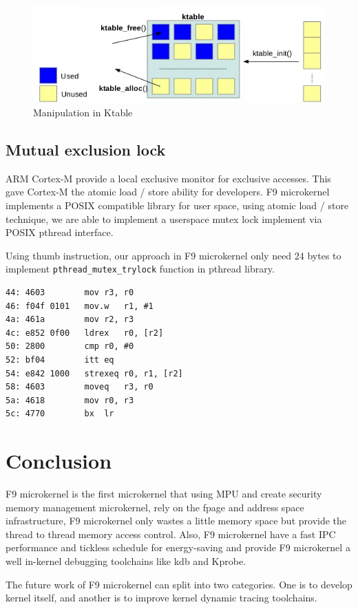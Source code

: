 \documentclass[10pt,preprint,nocopyrightspace]{sigplanconf}
\begin{document}
\begin{figure}[H]
	\begin{center}
		\includegraphics[width=\linewidth]{picture/ktable.png}
	\end{center}
	\caption{Manipulation in Ktable\cite{ncku2015}}
\end{figure}

\subsection{Mutual exclusion lock}
ARM Cortex-M provide a local exclusive monitor for exclusive accesses. This gave Cortex-M the atomic load / store ability for developers\cite{arm2012v7}. F9 microkernel implements a POSIX compatible library for user space, using atomic load / store technique, we are able to implement a userspace mutex lock implement via POSIX pthread interface.

Using thumb instruction, our approach in F9 microkernel only need 24 bytes to implement \texttt{pthread\_mutex\_trylock} function in pthread library.

\begin{lstlisting}[basicstyle=\small,frame=single]
44:	4603      	mov	r3, r0
46:	f04f 0101 	mov.w	r1, #1
4a:	461a      	mov	r2, r3
4c:	e852 0f00 	ldrex	r0, [r2]
50:	2800      	cmp	r0, #0
52:	bf04      	itt	eq
54:	e842 1000 	strexeq	r0, r1, [r2]
58:	4603      	moveq	r3, r0
5a:	4618      	mov	r0, r3
5c:	4770      	bx	lr
\end{lstlisting}

\section{Conclusion}
F9 microkernel is the first microkernel that using MPU and create security memory management microkernel, rely on the fpage and address space infrastructure, F9 microkernel only wastes a little memory space but provide the thread to thread memory access control. Also, F9 microkernel have a fast IPC performance and tickless schedule for energy-saving and provide F9 microkernel a well in-kernel debugging toolchains like kdb and Kprobe.

The future work of F9 microkernel can split into two categories. One is to develop kernel itself, and another is to improve kernel dynamic tracing toolchains.


\end{document}
